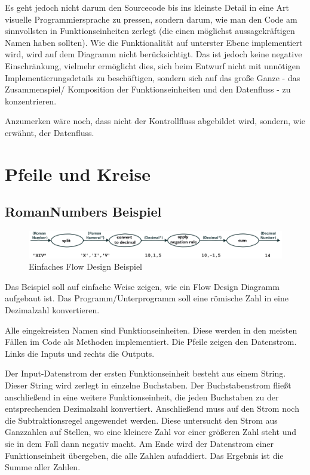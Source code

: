Es geht jedoch nicht darum den Sourcecode bis ins kleinste Detail in eine Art visuelle Programmiersprache zu pressen,
sondern darum, wie man den Code am sinnvollsten in Funktionseinheiten zerlegt (die einen möglichst aussagekräftigen Namen haben sollten).
Wie die Funktionalität auf unterster Ebene implementiert wird, wird auf dem Diagramm nicht berücksichtigt.
Das ist jedoch keine negative Einschränkung, vielmehr ermöglicht dies, sich beim Entwurf nicht mit unnötigen Implementierungsdetails zu beschäftigen, sondern sich auf das große Ganze - das Zusammenspiel/ Komposition der Funktionseinheiten und den Datenfluss - zu konzentrieren.


Anzumerken wäre noch, dass nicht der Kontrollfluss abgebildet wird, sondern, wie erwähnt, der Datenfluss.


\chapter{Pfeile und Kreise}

\section{RomanNumbers Beispiel}

\begin{center}
\begin{figure}[H]
	\includegraphics[width=1.0\linewidth]{./img/FromRomanNumerals.png}
	\caption{Einfaches Flow Design Beispiel}
\end{figure}
\end{center}




Das Beispiel soll auf einfache Weise zeigen, wie ein Flow Design Diagramm aufgebaut ist.
Das Programm/Unterprogramm soll eine römische Zahl in eine Dezimalzahl konvertieren.

Alle eingekreisten Namen sind Funktionseinheiten.
Diese werden in den meisten Fällen im Code als Methoden implementiert.
Die Pfeile zeigen den Datenstrom. Links die Inputs und rechts die Outputs.


Der Input-Datenstrom der ersten Funktionseinheit besteht aus einem String. Dieser String wird zerlegt in einzelne Buchstaben.
Der Buchstabenstrom fließt anschließend in eine weitere Funktionseinheit, die jeden Buchstaben zu der entsprechenden
Dezimalzahl konvertiert. Anschließend muss auf den Strom noch die Subtraktionsregel angewendet werden. Diese untersucht den
Strom aus Ganzzahlen auf Stellen, wo eine kleinere Zahl vor einer größeren Zahl steht und sie in dem Fall dann negativ macht.
Am Ende wird der Datenstrom einer Funktionseinheit übergeben, die alle Zahlen aufaddiert.
Das Ergebnis ist die Summe aller Zahlen.


